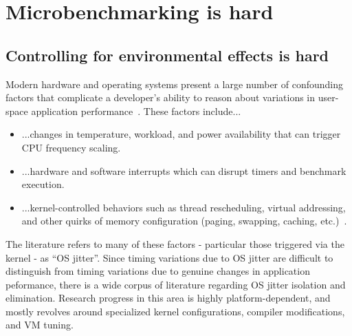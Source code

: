 \documentclass[conference]{IEEEtran}
\begin{document}
\label{sec:challenges}
\section{Microbenchmarking is hard}

\subsection{Controlling for environmental effects is hard}

Modern hardware and operating systems present a large number of confounding factors that
complicate a developer's ability to reason about variations in user-space application
performance~\cite{HP5e}. These factors include...

\begin{itemize}
    \item ...changes in temperature, workload, and power availability that can trigger
    CPU frequency scaling.
    \item ...hardware and software interrupts which can disrupt timers and benchmark
    execution.
    \item ...kernel-controlled behaviors such as thread rescheduling, virtual addressing,
    and other quirks of memory configuration (paging, swapping, caching,
    etc.)~\cite{Oyama2014,Oyama2016}.
\end{itemize}

The literature refers to many of these factors - particular those triggered via the kernel -
as ``OS jitter''. Since timing variations due to OS jitter are difficult to distinguish from
timing variations due to genuine changes in application peformance, there is a wide corpus
of literature regarding OS jitter isolation and elimination. Research progress in this area
is highly platform-dependent, and mostly revolves around specialized kernel configurations,
compiler modifications, and VM tuning.

\end{document}
